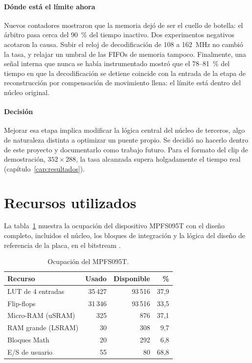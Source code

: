 \paragraph{Dónde está el límite ahora}
Nuevos contadores mostraron que la memoria dejó de ser el cuello de botella:
el árbitro pasa cerca del 90~\% del tiempo inactivo. Dos experimentos
negativos acotaron la causa. Subir el reloj de decodificación de 108 a
162~MHz no cambió la tasa, y relajar un umbral de las FIFOs de memoria
tampoco. Finalmente, una señal interna que nunca se había instrumentado
mostró que el 78--81~\% del tiempo en que la decodificación se detiene
coincide con la entrada de la etapa de reconstrucción por compensación de
movimiento llena: el límite está dentro del núcleo original.

\paragraph{Decisión}
Mejorar esa etapa implica modificar la lógica central del núcleo de
terceros, algo de naturaleza distinta a optimizar un puente propio. Se
decidió no hacerlo dentro de este proyecto y documentarlo como trabajo
futuro. Para el formato del clip de demostración, $352 \times 288$, la tasa
alcanzada supera holgadamente el tiempo real (capítulo~\ref{cap:resultados}).

\section{Recursos utilizados}

La tabla~\ref{tab:recursos} muestra la ocupación del dispositivo MPFS095T
con el diseño completo, incluidos el núcleo, los bloques de integración y la
lógica del diseño de referencia de la placa, en el bitstream
.

\begin{table}[ht]
  \centering\small
  \begin{tabular}{@{}l r r r@{}}
    \toprule
    \textbf{Recurso} & \textbf{Usado} & \textbf{Disponible} & \textbf{\%} \\
    \midrule
    LUT de 4 entradas & 35\,427 & 93\,516 & 37,9 \\
    Flip-flops        & 31\,346 & 93\,516 & 33,5 \\
    Micro-RAM (uSRAM) & 325     & 876     & 37,1 \\
    RAM grande (LSRAM)& 30      & 308     & 9,7 \\
    Bloques Math      & 20      & 292     & 6,8 \\
    E/S de usuario    & 55      & 80      & 68,8 \\
    \bottomrule
  \end{tabular}
  \caption{Ocupación del MPFS095T.}
  \label{tab:recursos}
\end{table}

